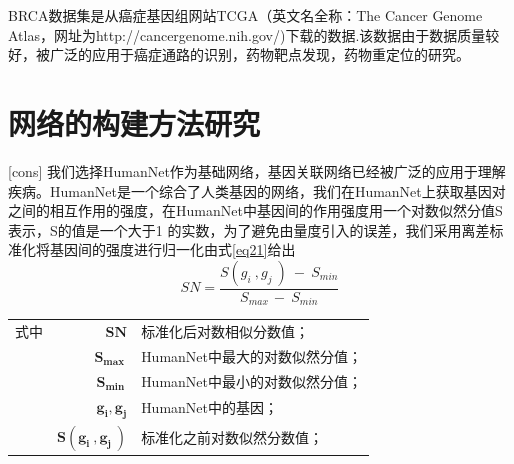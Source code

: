 BRCA数据集是从癌症基因组网站TCGA（英文名全称：The Cancer Genome Atlas，网址为http://cancergenome.nih.gov/)下载的数据.该数据由于数据质量较好，被广泛的应用于癌症通路的识别，药物靶点发现，药物重定位的研究。

\section{网络的构建方法研究}[cons]
\label{cons}
我们选择HumanNet作为基础网络，基因关联网络已经被广泛的应用于理解疾病。HumanNet是一个综合了人类基因的网络，我们在HumanNet上获取基因对之间的相互作用的强度，在HumanNet中基因间的作用强度用一个对数似然分值S表示，S的值是一个大于1 的实数，为了避免由量度引入的误差，我们采用离差标准化将基因间的强度进行归一化由式\ref{eq21}给出
\begin{equation}\label{eq21}
SN=\frac{S( g_{i} \ ,g_{j} \ ) \ -\ S_{min}}{S_{max\ } -\ S_{min}}
\end{equation}

\begin{tabularx}{\textwidth}{@{}l@{\quad}r@{———}X@{}}
式中& $\boldsymbol{SN}$ & 标准化后对数相似分数值；\\
	& $\boldsymbol{S_{max\ }}$ &HumanNet中最大的对数似然分值；\\
	& $\boldsymbol{S_{min\ }}$ &HumanNet中最小的对数似然分值；\\
	 & $\boldsymbol{ g_{i}, g_{j}}$ &HumanNet中的基因；\\
	& $\boldsymbol{S( g_{i} \ ,g_{j} \ )}$ & 标准化之前对数似然分数值；\\
\end{tabularx}\vspace{3.15bp}

